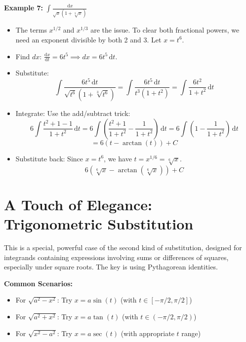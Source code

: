 \documentclass[11pt]{article}
\newcommand{\dx}{\,\mathrm{d}x} %
\newcommand{\dt}{\,\mathrm{d}t} %
\newcommand{\ddt}[1]{\frac{\mathrm{d}#1}{\mathrm{d}t}} %
\begin{document}
\textbf{Example 7:} $\int \frac{\dx}{\sqrt{x}(1 + \sqrt[3]{x})}$
\begin{itemize}
    \item The terms $x^{1/2}$ and $x^{1/3}$ are the issue. To clear both fractional powers, we need an exponent divisible by both 2 and 3. Let $x = t^6$.
    \item Find $dx$: $\ddt{x} = 6t^5 \implies dx = 6t^5 \dt$.
    \item Substitute:
    \[ \int \frac{6t^5 \dt}{\sqrt{t^6}(1 + \sqrt[3]{t^6})} = \int \frac{6t^5 \dt}{t^3(1 + t^2)} = \int \frac{6t^2}{1+t^2} \dt \]
    \item Integrate: Use the add/subtract trick:
    \[ 6 \int \frac{t^2+1-1}{1+t^2} \dt = 6 \int \left( \frac{t^2+1}{1+t^2} - \frac{1}{1+t^2} \right) \dt = 6 \int \left( 1 - \frac{1}{1+t^2} \right) \dt \]
    \[ = 6 (t - \arctan(t)) + C \]
    \item Substitute back: Since $x = t^6$, we have $t = x^{1/6} = \sqrt[6]{x}$.
    \[ \boxed{6(\sqrt[6]{x} - \arctan(\sqrt[6]{x})) + C} \]
\end{itemize}

\section{A Touch of Elegance: Trigonometric Substitution}

This is a special, powerful case of the second kind of substitution, designed for integrands containing expressions involving sums or differences of squares, especially under square roots. The key is using Pythagorean identities.

\textbf{Common Scenarios:}
\begin{itemize}
    \item For $\sqrt{a^2 - x^2}$: Try $x = a \sin(t)$ (with $t \in [-\pi/2, \pi/2]$)
    \item For $\sqrt{a^2 + x^2}$: Try $x = a \tan(t)$ (with $t \in (-\pi/2, \pi/2)$)
    \item For $\sqrt{x^2 - a^2}$: Try $x = a \sec(t)$ (with appropriate $t$ range)
\end{itemize}
\end{document}
